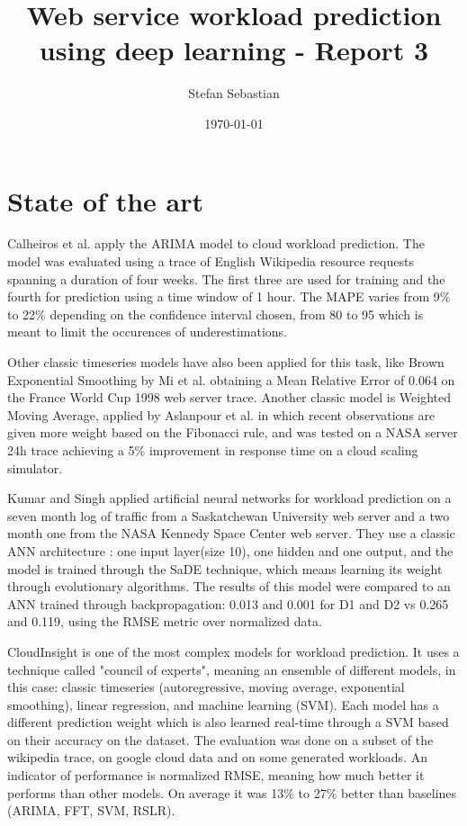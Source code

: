 \documentclass[12pt]{article}
\title{Web service workload prediction using deep learning - Report 3}
\date{\today}
\author{Stefan Sebastian}
\begin{document}
  \maketitle
  
  \newpage
  \tableofcontents
  \newpage 

  \section{State of the art}

  Calheiros et al.\cite{arima_prediction} apply the ARIMA model
  to cloud workload prediction. The model was evaluated using a trace of English Wikipedia resource requests
  spanning a duration of four weeks. The first three are used for training and the fourth for prediction 
  using a time window of 1 hour. The MAPE varies from 9\% to 22\% depending on the confidence interval chosen, 
  from 80 to 95 which is meant to limit the occurences of underestimations.

  Other classic timeseries models have also been applied for this task, like Brown Exponential 
  Smoothing by Mi et al.\cite{brown_prediction} obtaining a Mean Relative Error of 0.064 on 
  the France World Cup 1998 web server trace. Another classic model is Weighted Moving Average,
  applied by Aslanpour et al.\cite{wma_prediction} 
  in which recent observations are given more weight based on the Fibonacci rule, and was tested 
  on a NASA server 24h trace achieving a 5\% improvement in response time on a cloud scaling 
  simulator.

  Kumar and Singh\cite{ann_prediction} applied artificial neural networks 
  for workload prediction on a seven month log of traffic from a Saskatchewan University 
  web server and a two month one from the NASA Kennedy Space Center web server. They use 
  a classic ANN architecture : one input layer(size 10), one hidden and one output, and the model 
  is trained through the SaDE technique, which means learning its weight through evolutionary algorithms.
  The results of this model were compared to an ANN trained through backpropagation: 0.013 and 0.001 for D1 and
  D2 vs 0.265 and 0.119, using the RMSE metric over normalized data.

  CloudInsight\cite{CloudInsight} is one of the most complex models for workload prediction. It uses a technique called "council 
  of experts", meaning an ensemble of different models, in this case: classic timeseries (autoregressive, moving average, exponential smoothing),
  linear regression, and machine learning (SVM). Each model has a different prediction weight which is also learned real-time through 
  a SVM based on their accuracy on the dataset. The evaluation was done on a subset of the wikipedia trace\cite{wikidata}, on google 
  cloud data and on some generated workloads. An indicator of performance is normalized RMSE, meaning how much better it performs than 
  other models. On average it was 13\% to 27\% better than baselines (ARIMA, FFT, SVM, RSLR).
  
\end{document}
